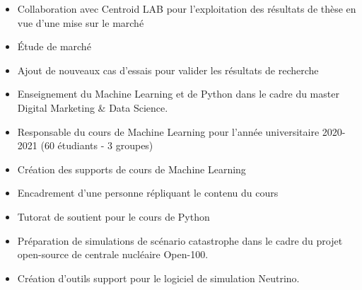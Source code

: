 \documentclass[10pt,a4paper,ragged2e,withhyper]{altacv}
\begin{document}
\begin{paracol}{2}
            \begin{itemize}
                \item Collaboration avec Centroid LAB pour l'exploitation des résultats de thèse en vue d'une mise sur le marché 
                \item Étude de marché
                \item Ajout de nouveaux cas d'essais pour valider les résultats de recherche
            \end{itemize}
            
            \medskip
            
            \begin{itemize}
                \item Enseignement du Machine Learning et de Python dans le cadre du master Digital Marketing \& Data Science.
                \item Responsable du cours de Machine Learning pour l'année universitaire 2020-2021 (60 étudiants - 3 groupes)
                \item Création des supports de cours de Machine Learning
                \item Encadrement d'une personne répliquant le contenu du cours
                \item Tutorat de soutient pour le cours de Python
            \end{itemize}
            
            \divider
            
            \begin{itemize}
                \item Préparation de simulations de scénario catastrophe dans le cadre du projet open-source de centrale nucléaire Open-100.
                \item Création d'outils support pour le logiciel de simulation Neutrino.
            \end{itemize}
            
            \divider
            

\end{paracol}
\end{document}
